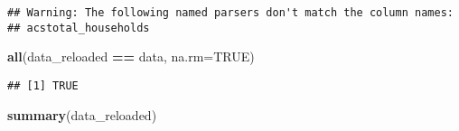 \documentclass[]{article}
\newenvironment{Shaded}{\begin{snugshade}}{\end{snugshade}}
\newcommand{\DataTypeTok}[1]{\textcolor[rgb]{0.13,0.29,0.53}{#1}}
\newcommand{\KeywordTok}[1]{\textcolor[rgb]{0.13,0.29,0.53}{\textbf{#1}}}
\newcommand{\NormalTok}[1]{#1}
\newcommand{\OperatorTok}[1]{\textcolor[rgb]{0.81,0.36,0.00}{\textbf{#1}}}
\newcommand{\OtherTok}[1]{\textcolor[rgb]{0.56,0.35,0.01}{#1}}
\newcommand{\StringTok}[1]{\textcolor[rgb]{0.31,0.60,0.02}{#1}}
\begin{document}
\begin{verbatim}
## Warning: The following named parsers don't match the column names:
## acstotal_households
\end{verbatim}

\begin{Shaded}
\begin{Highlighting}[]
\KeywordTok{all}\NormalTok{(data_reloaded }\OperatorTok{==}\StringTok{ }\NormalTok{data, }\DataTypeTok{na.rm=}\OtherTok{TRUE}\NormalTok{)}
\end{Highlighting}
\end{Shaded}

\begin{verbatim}
## [1] TRUE
\end{verbatim}

\begin{Shaded}
\begin{Highlighting}[]
\KeywordTok{summary}\NormalTok{(data_reloaded)}
\end{Highlighting}
\end{Shaded}
\end{document}
